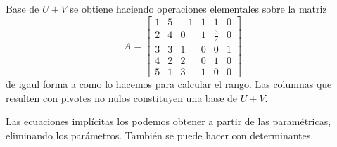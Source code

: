 \begin{enumerate}[label=\color{red}\arabic*), leftmargin=*]
        Base de $U+V$ se obtiene haciendo operaciones elementales sobre la matriz \[ A=\begin{bmatrix}
        	1 & 5 & -1 & 1 & 1 & 0 \\
        	2 & 4 & 0 & 1 & \frac{3}{2} & 0 \\
        	3 & 3 & 1 & 0 & 0 & 1 \\
        	4 & 2 & 2 & 0 & 1 & 0 \\
        	5 & 1 & 3 & 1 & 0 & 0
        \end{bmatrix} \] de igaul forma a como lo hacemos para calcular el rango. Las columnas que resulten con pivotes no nulos constituyen una base de $U+V$.
        
        Las ecuaciones implícitas los podemos obtener a partir de las paramétricas, eliminando los parámetros. También se puede hacer con determinantes.
\end{enumerate}
